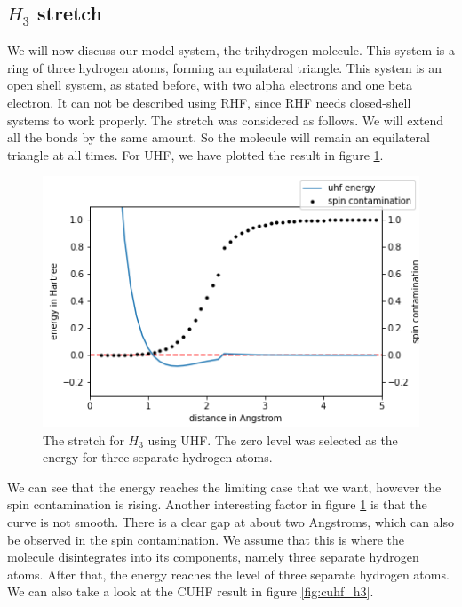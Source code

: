 \documentclass[twoside,twocolumn,9pt]{article}
\begin{document}
\subsection{$H_3$ stretch}
\label{subsec:h3}
We will now discuss our model system, the trihydrogen molecule. This system is a ring of three hydrogen atoms, forming an equilateral triangle.
This system is an open shell system, as stated before, with two alpha electrons and one beta electron. It can not be described using RHF, since RHF needs closed-shell systems to work properly.
The stretch was considered as follows. We will extend all the bonds by the same amount. So the molecule will remain an equilateral triangle at all times. For UHF, we have plotted
the result in figure \ref{fig:uhf_h3}.
\begin{center}
  \begin{figure}[h]
    \includegraphics[width=\linewidth]{./../notes/figures/uhf_h3.png}
    \caption{The stretch for $H_3$ using UHF. The zero level was selected as the energy for three separate hydrogen atoms.}
    \label{fig:uhf_h3}
  \end{figure}
\end{center}
We can see that the energy reaches the limiting case that we want, however the spin contamination is rising. Another interesting factor in figure \ref{fig:uhf_h3} is that the curve 
is not smooth. There is a clear gap at about two Angstroms, which can also be observed in the spin contamination. We assume that this is where the molecule disintegrates
into its components, namely three separate hydrogen atoms. After that, the energy reaches the level of three separate hydrogen atoms. We can also take a look at the CUHF result in
figure \ref{fig:cuhf_h3}.
\end{document}
